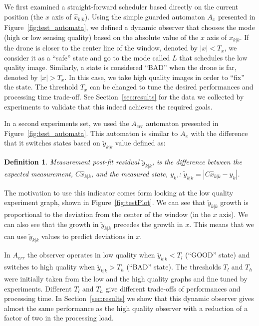 \documentclass{sig-alternate-ipsn13}
\newtheorem{dfn}[thm]{Definition}
\begin{document}
We first examined a straight-forward scheduler based directly on the current position (the $x$ axis of $\hat{x}_{k|k}$). Using the simple guarded automaton $A_{x}$ presented in Figure~\ref{fig:test_automata}, we defined a dynamic observer that chooses the mode (high or low sensing quality) based on the absolute value of the $x$ axis of $\hat{x}_{k|k}$. If the drone is closer to the center line of the window, denoted by $|x| < T_x$, we consider it as a ``safe'' state and go to the mode called $L$ that schedules the low quality image.
Similarly, a state is considered ``BAD'' when the drone is far, denoted by $|x| > T_x$. In this case, we take high quality images in order to ``fix'' the state.
The threshold $T_x$ can be changed to tune the desired performances and processing time trade-off.
See Section~\ref{sec:results} for the data we collected by experiments to validate that this indeed achieves the required goals. 

In a second experiments set, we used the $A_{err}$ automaton presented in Figure~\ref{fig:test_automata}. This automaton is similar to $A_x$ with the difference that it switches states based on $\tilde{y}_{k|k}$ value  defined as:

\begin{dfn}
\textit{Measurement post-fit residual} $\tilde{y}_{k|k}$, is the difference between the expected measurement, $C\hat{x}_{k|k}$, and the measured state, $y_k$,: $\tilde{y}_{k|k} = |  C\hat{x}_{k|k} - y_k |$.%
\end{dfn}

The motivation to use this indicator comes form looking at the low quality experiment graph, shown in Figure~\ref{fig:testPlot}. We can see that $\tilde{y}_{k|k}$ growth is proportional to the deviation from the center of the window (in the $x$ axis). We can also see that the growth in $\tilde{y}_{k|k}$ precedes the growth in $x$. This means that we can use $\tilde{y}_{k|k}$ values to predict deviations in $x$.


In $A_{err}$ the observer operates in low quality when $\tilde{y}_{k|k} < T_{l}$ (``GOOD'' state) and switches to high quality when $\tilde{y}_{k|k} > T_{h}$ (``BAD'' state).
The thresholds $T_{l}$ and $T_{h}$ were initially taken from the low and the high quality graphs and fine tuned by experiments. 
Different $T_{l}$ and $T_{h}$ give different trade-offs of performances and processing time.
In Section~\ref{sec:results} we show that this dynamic observer gives almost the same performance as the high quality observer with a reduction of a factor of two in the processing load.
\end{document}
